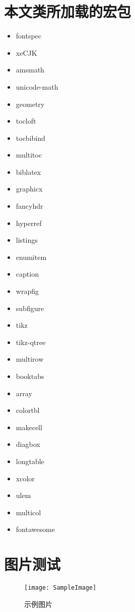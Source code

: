 \section{本文类所加载的宏包}
\begin{multicols}{4}
    \begin{itemize}
        \item fontspec
        \item xeCJK
        \item amsmath
        \item unicode-math
        \item geometry
        \item tocloft
        \item tocbibind
        \item multitoc
        \item biblatex
        \item graphicx
        \item fancyhdr
        \item hyperref
        \item listings
        \item enumitem
        \item caption
        \item wrapfig
        \item subfigure
        \item tikz
        \item tikz-qtree
        \item multirow
        \item booktabs
        \item array
        \item colortbl
        \item makecell
        \item diagbox
        \item longtable
        \item xcolor
        \item ulem
        \item multicol
        \item fontawesome
    \end{itemize}
\end{multicols}

\section{图片测试}
\sampletext

\begin{figure}[h]
    \centering
    \texttt{[image: SampleImage]}
    \caption{示例图片}
\end{figure}

